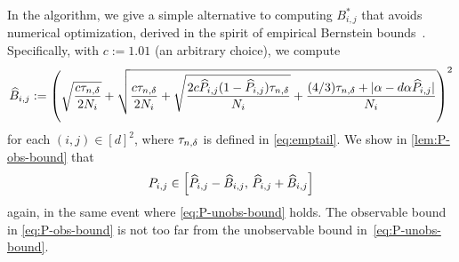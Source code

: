 In the algorithm, we give a simple alternative to computing
$B_{i,j}^*$ that avoids numerical optimization, derived in the spirit
of empirical Bernstein bounds~\citep{audibert2009}.
Specifically, with $c := 1.01$ (an arbitrary choice), we compute
\begin{equation}
  \widehat{B}_{i,j}
  :=
  \left(
    \sqrt{\frac{c\tau_{n,\delta}}{2N_i}}
    + \sqrt{
      \frac{c\tau_{n,\delta}}{2N_i}
      +
      \sqrt{\frac{2c\widehat{P}_{i,j}(1-\widehat{P}_{i,j})\tau_{n,\delta}}{N_i}}
      + \frac{(4/3)\tau_{n,\delta} + |\alpha-d\alpha\widehat{P}_{i,j}|}{N_i}
    }
  \right)^2
  \label{eq:P-obs-bound}
\end{equation}
for each $(i,j) \in [d]^2$, where $\tau_{n,\delta}$ is defined in
\cref{eq:emptail}.
We show in \cref{lem:P-obs-bound} that
\[
  P_{i,j} \in
  \left[
    \widehat{P}_{i,j} - \widehat{B}_{i,j},\,
    \widehat{P}_{i,j} + \widehat{B}_{i,j}
  \right]
\]
again, in the same event where \cref{eq:P-unobs-bound} holds.
The observable bound in \cref{eq:P-obs-bound} is not too far from the
unobservable bound in~\cref{eq:P-unobs-bound}.

